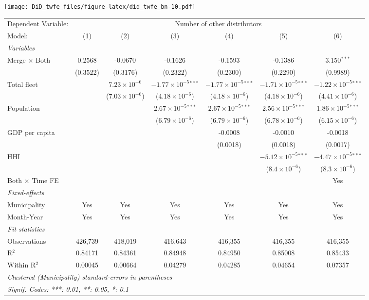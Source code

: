 \documentclass[
]{article}
\begin{document}
\texttt{[image: DiD\_twfe\_files/figure-latex/did\_twfe\_bn-10.pdf]}

\begin{tabular}{lcccccc}
\tabularnewline\midrule\midrule
Dependent Variable:&\multicolumn{6}{c}{Number of other distributors}\\
Model:&(1) & (2) & (3) & (4) & (5) & (6)\\
\midrule \emph{Variables}&   &   &   &   &   &  \\
Merge $\times $ Both & 0.2568 & -0.0670 & -0.1626 & -0.1593 & -0.1386 & 3.150$^{***}$\\
  &(0.3522) & (0.3176) & (0.2322) & (0.2300) & (0.2290) & (0.9989)\\
Total fleet &    & $7.23\times 10^{-6}$ & $-1.77\times 10^{-5}$$^{***}$ & $-1.77\times 10^{-5}$$^{***}$ & $-1.71\times 10^{-5}$$^{***}$ & $-1.22\times 10^{-5}$$^{***}$\\
  &   & ($7.03\times 10^{-6}$) & ($4.18\times 10^{-6}$) & ($4.18\times 10^{-6}$) & ($4.18\times 10^{-6}$) & ($4.41\times 10^{-6}$)\\
Population &    &    & $2.67\times 10^{-5}$$^{***}$ & $2.67\times 10^{-5}$$^{***}$ & $2.56\times 10^{-5}$$^{***}$ & $1.86\times 10^{-5}$$^{***}$\\
  &   &    & ($6.79\times 10^{-6}$) & ($6.79\times 10^{-6}$) & ($6.78\times 10^{-6}$) & ($6.15\times 10^{-6}$)\\
GDP per capita &    &    &    & -0.0008 & -0.0010 & -0.0018\\
  &   &    &    & (0.0018) & (0.0018) & (0.0017)\\
HHI &    &    &    &    & $-5.12\times 10^{-5}$$^{***}$ & $-4.47\times 10^{-5}$$^{***}$\\
  &   &    &    &    & ($8.4\times 10^{-6}$) & ($8.3\times 10^{-6}$)\\
Both $\times$ Time FE &  &  &  &  &  & Yes\\
\midrule \emph{Fixed-effects}&   &   &   &   &   &  \\
Municipality & Yes & Yes & Yes & Yes & Yes & Yes\\
Month-Year & Yes & Yes & Yes & Yes & Yes & Yes\\
\midrule \emph{Fit statistics}&  & & & & & \\
Observations & 426,739&418,019&416,643&416,355&416,355&416,355\\
R$^2$ & 0.84171&0.84361&0.84948&0.84950&0.85008&0.85433\\
Within R$^2$ & 0.00045&0.00664&0.04279&0.04285&0.04654&0.07357\\
\midrule\midrule\multicolumn{7}{l}{\emph{Clustered (Municipality) standard-errors in parentheses}}\\
\multicolumn{7}{l}{\emph{Signif. Codes: ***: 0.01, **: 0.05, *: 0.1}}\\
\end{tabular}
\end{document}
